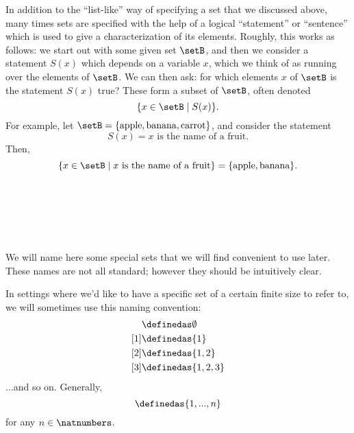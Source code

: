 {In addition to the ``list-like'' way of specifying a set that we discussed above, many times sets are specified with the help of a logical ``statement'' or ``sentence'' which is used to give a characterization of its elements. Roughly, this works as follows: we start out with some given set $\setB$, and then we consider a statement $S(x)$ which depends on a variable $x$, which we think of as running over the elements of $\setB$. We can then ask: for which elements $x$ of $\setB$ is the statement $S(x)$ true? These form a subset of $\setB$, often denoted 
\begin{equation}
\{ x \in \setB \mid S(x) \}.
\end{equation}
For example, let $\setB = \{ \text{apple}, \text{banana}, \text{carrot} \}$, and consider the statement 
\begin{equation}
S(x) = x \text{ is the name of a fruit}.
\end{equation}
Then, 
\begin{equation}
\{ x \in \setB \mid x \text{ is the name of a fruit} \} = \{ \text{apple}, \text{banana} \}.
\end{equation}



\

\



\


We will name here some special sets that we will find convenient to use later. These names are not all standard; however they should be intuitively clear.

In settings where we'd like to have a specific set of a certain finite size to refer to, we will sometimes use this naming convention:
\begin{align*}
[0]
  & \definedas \emptyset \\
  [1] & \definedas \{ 1\} \\
  [2] & \definedas \{ 1, 2\} \\
  [3] & \definedas \{ 1, 2, 3\}
\end{align*}
...and so on. Generally,
\begin{equation}
[n]
  \definedas \{ 1, ..., n\}
\end{equation}
for any $n \in \natnumbers$.}



\clearpage
